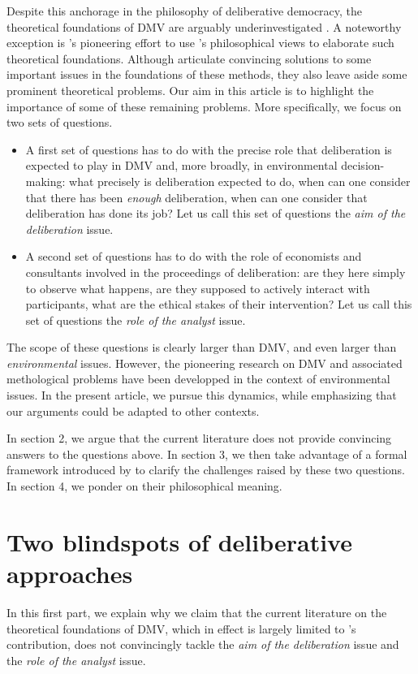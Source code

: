 \documentclass[version=3.21, pagesize, twoside=off, bibliography=totoc, DIV=calc, fontsize=12pt, a4paper, french, english]{scrartcl}
\begin{document}
Despite this anchorage in the philosophy of deliberative democracy, the theoretical foundations of DMV are arguably underinvestigated \citep{bartkowski_economic_2017,bartkowski_beyond_2018,bunse_what_2015,kenter_what_2015}. 
A noteworthy exception is \citet{bartkowski_beyond_2018}'s pioneering effort to use \citet{sen_idea_2009}'s philosophical views to elaborate such theoretical foundations. 
Although \citet{bartkowski_beyond_2018} articulate convincing solutions to some important issues in the foundations of these methods, they also leave aside some prominent theoretical problems. 
Our aim in this article is to highlight the importance of some of these remaining problems. 
More specifically, we focus on two sets of questions.
\begin{itemize}
\item A first set of questions has to do with the precise role that deliberation is expected to play in DMV and, more broadly, in environmental decision-making: what precisely is deliberation expected to do, when can one consider that there has been \emph{enough} deliberation, when can one consider that deliberation has done its job?
Let us call this set of questions the \emph{aim of the deliberation} issue.
\item A second set of questions has to do with the role of economists and consultants involved in the proceedings of deliberation: are they here simply to observe what happens, are they supposed to actively interact with participants, what are the ethical stakes of their intervention? 
Let us call this set of questions the \emph{role of the analyst} issue.
\end{itemize}
The scope of these questions is clearly larger than DMV, and even larger than \emph{environmental} issues. 
However, the pioneering research on DMV and associated methological problems have been developped in the context of environmental issues. 
In the present article, we pursue this dynamics, while emphasizing that our arguments could be adapted to other contexts.

In section 2, we argue that the current literature does not provide convincing answers to the questions above. 
In section 3, we then take advantage of a formal framework introduced by \citet{cailloux_formal_2018} to clarify the challenges raised by these two questions.
In section 4, we ponder on their philosophical meaning.

\section{Two blindspots of deliberative approaches}
In this first part, we explain why we claim that the current literature on the theoretical foundations of DMV, which in effect is largely limited to \citet{bartkowski_beyond_2018}'s contribution, does not convincingly tackle the \emph{aim of the deliberation} issue and the \emph{role of the analyst} issue.
\end{document}
